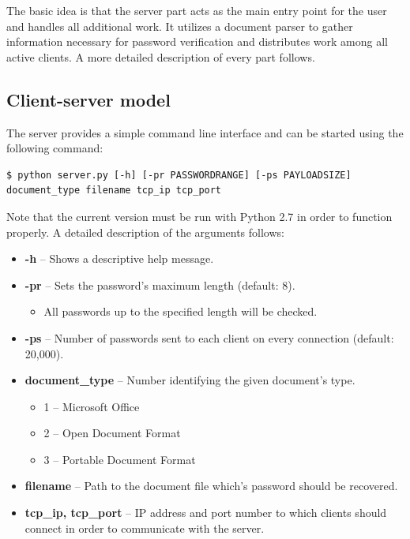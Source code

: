 \documentclass[11pt,oneside]{fithesis2}
\begin{document}
The basic idea is that the server part acts as the main entry point for the user and handles all additional work. It utilizes a document parser to gather information necessary for password verification and distributes work among all active clients. A more detailed description of every part follows. 

\subsection{Client-server model}\label{client-server}

The server provides a simple command line interface and can be started using the following command: 

\begin{lstlisting}
$ python server.py [-h] [-pr PASSWORDRANGE] [-ps PAYLOADSIZE] document_type filename tcp_ip tcp_port
\end{lstlisting}

Note that the current version must be run with Python 2.7 in order to function properly. A detailed description of the arguments follows:

\begin{itemize}
\setlength\itemsep{0.1em}
	\item{\textbf{-h} -- Shows a descriptive help message.}
	\item{\textbf{-pr} -- Sets the password's maximum length (default: 8).}
		\begin{itemize}
		\setlength\itemsep{0.1em}
			\item{All passwords up to the specified length will be checked.}
		\end{itemize}
	\item{\textbf{-ps} -- Number of passwords sent to each client on every connection (default: 20,000).}
	\item{\textbf{document\_type} -- Number identifying the given document's type.}
		\begin{itemize}
		\setlength\itemsep{0.1em}
			\item{1 -- Microsoft Office}
			\item{2 -- Open Document Format}
			\item{3 -- Portable Document Format}
		\end{itemize}
	\item{\textbf{filename} -- Path to the document file which's password should be recovered.}
	\item{\textbf{tcp\_ip, tcp\_port} --  IP address and port number to which clients should connect in order to communicate with the server.}
\end{itemize}\label{server_params}
\end{document}

